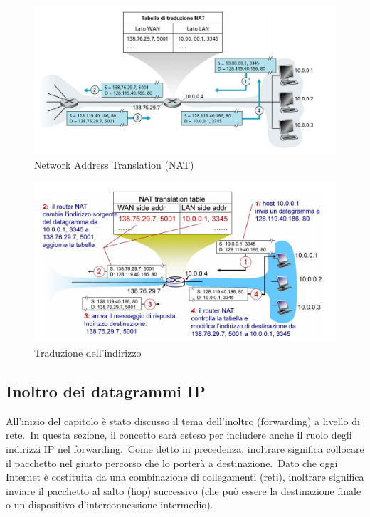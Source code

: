 \begin{figure}[H]
    \centering
    \includegraphics[width=\textwidth]{immagini/NAT.jpg}
    \caption*{Network Address Translation (NAT)}

\end{figure}
\begin{figure}[H]
    \centering
    \includegraphics[width=\textwidth]{immagini/NAT2.jpg}
    \caption*{Traduzione dell'indirizzo}
\end{figure}

\subsection{Inoltro dei datagrammi IP}

All'inizio del capitolo è stato discusso il tema dell'inoltro (forwarding) a livello di rete.\
In questa sezione, il concetto sarà esteso per includere anche il ruolo degli indirizzi IP nel forwarding.\
Come detto in precedenza, inoltrare significa collocare il pacchetto nel giusto percorso che lo porterà a destinazione.\
Dato che oggi Internet è costituita da una combinazione di collegamenti (reti), inoltrare significa inviare il pacchetto al salto (hop) successivo (che può essere la destinazione finale o un dispositivo d'interconnessione intermedio).

